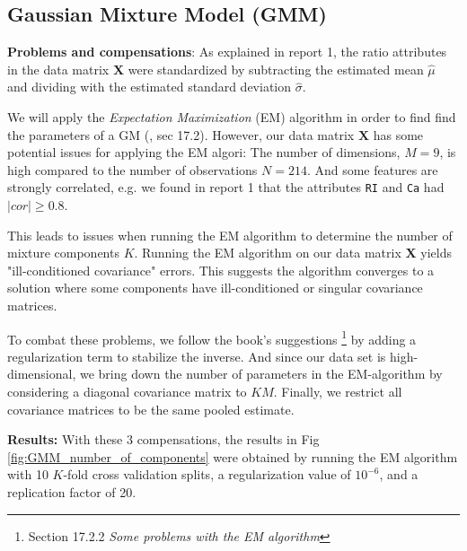 \subsection{Gaussian Mixture Model (GMM)}

\textbf{Problems and compensations}: As explained in report 1, the ratio attributes in the data matrix $\bm{X}$ were standardized by subtracting the estimated mean $\hat{\mu}$ and dividing with the estimated standard deviation $\hat{\sigma}$. 

We will apply the \textit{Expectation Maximization} (EM) algorithm in order to find find the parameters of a GM (\cite{coursenotes}, sec 17.2). However, our data matrix $\bm{X}$ has some potential issues for applying the EM algori: The number of dimensions, $M=9$, is high compared to the number of observations $N=214$.
And some features are strongly correlated, e.g. we found in report 1 that the attributes \texttt{RI} and \texttt{Ca} had $|cor| \geq 0.8$.

This leads to issues when running the EM algorithm to determine the number of mixture components $K$. Running the EM algorithm on our data matrix $\bm{X}$ yields "ill-conditioned covariance" errors. This suggests the algorithm converges to a solution where some components have ill-conditioned or singular covariance matrices.

To combat these problems, we follow the book's suggestions \cite{coursenotes}\footnote{Section 17.2.2 \textit{Some problems with the EM algorithm}} by adding a regularization term to stabilize the inverse. And since our data set is high-dimensional, we bring down the number of parameters in the EM-algorithm by considering a diagonal covariance matrix to $KM$. Finally, we restrict all covariance matrices to be the same pooled estimate.

\textbf{Results:} With these 3 compensations, the results in Fig \ref{fig:GMM_number_of_components} were obtained by running the EM algorithm with 10 $K$-fold cross validation splits, a regularization value of $10^{-6}$, and a replication factor of 20. 


